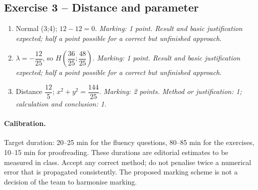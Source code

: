 \subsection*{Exercise 3 -- Distance and parameter}
\begin{enumerate}
\item Normal (3;4); $12-12=0$. \textit{Marking: 1 point. Result and basic justification expected; half a point possible for a correct but unfinished approach.}
\item $\lambda =-\dfrac{12}{25}$, so $H(\dfrac{36}{25};\dfrac{48}{25})$. \textit{Marking: 1 point. Result and basic justification expected; half a point possible for a correct but unfinished approach.}
\item Distance $\dfrac{12}{5}$; $x^2+y^2=\dfrac{144}{25}$. \textit{Marking: 2 points. Method or justification: 1; calculation and conclusion: 1.}
\end{enumerate}
\paragraph{Calibration.} Target duration: 20--25 min for the fluency questions, 80--85 min for the exercises, 10--15 min for proofreading. These durations are editorial estimates to be measured in class. Accept any correct method; do not penalise twice a numerical error that is propagated consistently. The proposed marking scheme is not a decision of the team to harmonise marking.
